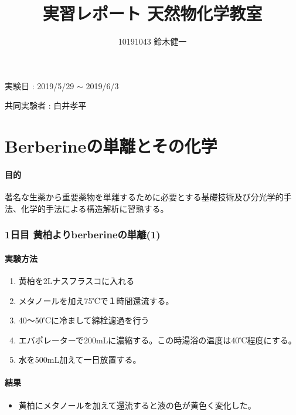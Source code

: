 \documentclass[a4paper,papersize,dvipdfmx]{jsarticle}
\begin{document}
\title{実習レポート 天然物化学教室}
\author{10191043 鈴木健一}
\date{}
\maketitle




\begin{flushright}
実験日 : 2019/5/29 $\sim$ 2019/6/3

共同実験者 : 白井孝平
\end{flushright}


\part{Berberineの単離とその化学}

\subsection*{目的}
著名な生薬から重要薬物を単離するために必要とする基礎技術及び分光学的手法、化学的手法による構造解析に習熟する。

\section*{1日目 黄柏よりberberineの単離(1)}
\subsection*{実験方法}
\begin{enumerate}
\item 黄柏を2Lナスフラスコに入れる
\item メタノールを加え75℃で１時間還流する。
\item 40〜50℃に冷まして綿栓濾過を行う
\item エバポレーターで200mLに濃縮する。この時湯浴の温度は40℃程度にする。
\item 水を500mL加えて一日放置する。
\end{enumerate}
\subsection*{結果}
\begin{itemize}
\item 黄柏にメタノールを加えて還流すると液の色が黄色く変化した。

\end{itemize}
\end{document}
